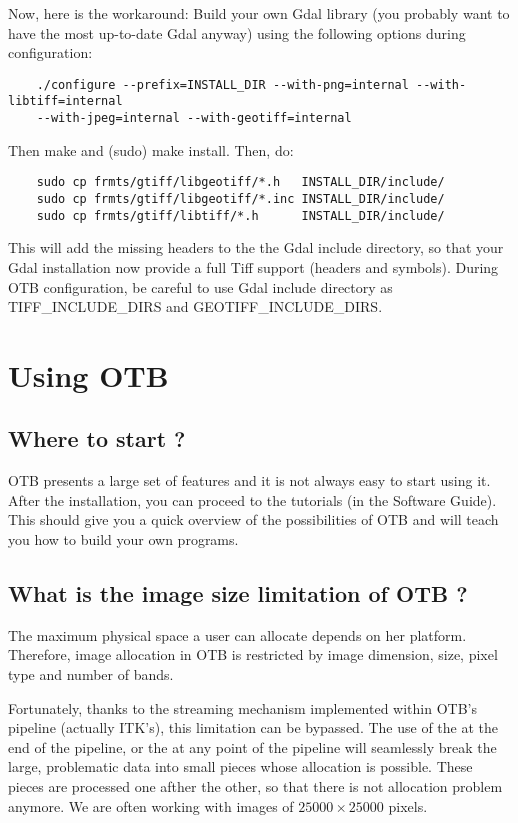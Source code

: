 Now, here is the workaround: Build your own Gdal library (you probably want to have the most up-to-date Gdal anyway) using the following options during configuration:
\begin{verbatim}
	./configure --prefix=INSTALL_DIR --with-png=internal --with-libtiff=internal
	--with-jpeg=internal --with-geotiff=internal
\end{verbatim}

Then make and (sudo) make install. Then, do:

\begin{verbatim}
	sudo cp frmts/gtiff/libgeotiff/*.h   INSTALL_DIR/include/
	sudo cp frmts/gtiff/libgeotiff/*.inc INSTALL_DIR/include/
	sudo cp frmts/gtiff/libtiff/*.h      INSTALL_DIR/include/ 
\end{verbatim}

This will add the missing headers to the the Gdal include directory, so that your Gdal installation now provide a full Tiff support (headers and symbols). During OTB configuration, be careful to use Gdal include directory as TIFF\_INCLUDE\_DIRS and GEOTIFF\_INCLUDE\_DIRS.

\section{Using OTB}

\subsection{Where to start ?}

OTB presents a large set of features and it is not always easy to start using it.
After the installation, you can proceed to the tutorials (in the Software Guide).
This should give you a quick overview of the possibilities of OTB and will teach
you how to build your own programs.

\subsection{What is the image size limitation of OTB ?}

The maximum physical space a user can allocate depends on her platform. Therefore,
image allocation in OTB is restricted by image dimension, size, pixel type and number
of bands.

Fortunately, thanks to the streaming mechanism implemented within
OTB's pipeline (actually ITK's), this limitation can be bypassed. The
use of the  at the end of the pipeline,
or the  at any point of the pipeline will
seamlessly break the large, problematic data into small pieces whose
allocation is possible. These pieces are processed one afther the
other, so that there is not allocation problem anymore. We are often working with
images of $25000 \times 25000$ pixels.

